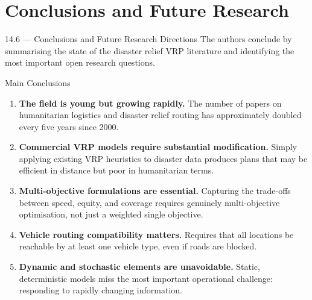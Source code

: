 \documentclass[aspectratio=169,10pt]{beamer}
\begin{document}
\section{Conclusions and Future Research}

\begin{frame}[allowframebreaks]{14.6 --- Conclusions and Future Research Directions}
  The authors conclude by summarising the state of the disaster relief
  VRP literature and identifying the most important open research questions.

  \medskip
  \begin{block}{Main Conclusions}
    \begin{enumerate}
      \item \textbf{The field is young but growing rapidly.}
            The number of papers on humanitarian logistics and disaster
            relief routing has approximately doubled every five years
            since 2000.
      \item \textbf{Commercial VRP models require substantial modification.}
            Simply applying existing VRP heuristics to disaster data
            produces plans that may be efficient in distance but poor
            in humanitarian terms.
      \item \textbf{Multi-objective formulations are essential.}
            Capturing the trade-offs between speed, equity, and coverage
            requires genuinely multi-objective optimisation, not just
            a weighted single objective.
      \item \textbf{Vehicle routing compatibility matters.}
            Requires that all locations be reachable by at least one
            vehicle type, even if roads are blocked.
      \item \textbf{Dynamic and stochastic elements are unavoidable.}
            Static, deterministic models miss the most important
            operational challenge: responding to rapidly changing
            information.
    \end{enumerate}
  \end{block}

  \framebreak


\end{frame}
\end{document}
